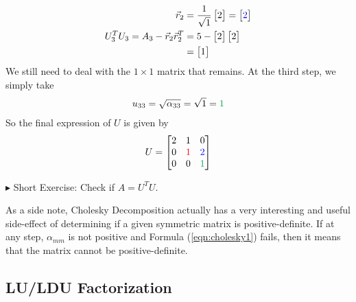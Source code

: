\begin{solution}
\begin{align*}
\vec{r}_2 &= \frac{1}{\sqrt{1}}
\begin{bmatrix}
2
\end{bmatrix}
=
\begin{bmatrix}
\textcolor{blue}{2}
\end{bmatrix} \\
U_3^T U_3 = A_3  - \vec{r}_2\vec{r}_2^T &=
5 - 
\begin{bmatrix}
2
\end{bmatrix}
\begin{bmatrix}
2
\end{bmatrix} \\
&= 
\begin{bmatrix}
1
\end{bmatrix}
\end{align*}
We still need to deal with the $1 \times 1$ matrix that remains. At the third step, we simply take
\begin{align*}
u_{33} = \sqrt{\alpha_{33}} = \sqrt{1} = \textcolor{Green}{1}
\end{align*}
So the final expression of $U$ is given by
\begin{align*}
U = 
\begin{bmatrix}
2 & 1 & 0 \\
0 & \textcolor{red}{1} & \textcolor{blue}{2} \\
0 & 0 & \textcolor{Green}{1}
\end{bmatrix}
\end{align*}
\end{solution}
$\blacktriangleright$ Short Exercise: Check if $A = U^T U$.\footnotemark\par
As a side note, Cholesky Decomposition actually has a very interesting and useful side-effect of determining if a given symmetric matrix is positive-definite. If at any step, $\alpha_{mm}$ is not positive and Formula (\ref{eqn:cholesky1}) fails, then it means that the matrix cannot be positive-definite.\footnotemark

\subsection{LU/LDU Factorization}

